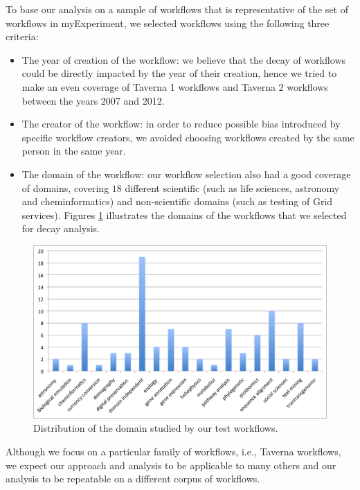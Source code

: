 To base our analysis on a sample of workflows that is representative of the set of workflows in myExperiment, we selected workflows using the following three criteria: 
\begin{itemize}
\item
The year of creation of the workflow: we believe that the decay of workflows could be directly impacted by the year of their creation, hence we tried to make an even coverage of Taverna 1 workflows \cite{DBLP:journals/bioinformatics/OinnAFMSGCGPWL04} and Taverna 2 workflows \cite{DBLP:conf/ssdbm/MissierSOTNDWOG10} between the years 2007 and 2012.
\item
The creator of the workflow:  in order to reduce possible bias introduced by specific workflow creators, we avoided choosing workflows created by the same person in the same year.
\item
The domain of the workflow: our workflow selection also had a good coverage of domains, covering $18$ different scientific (such as life sciences, astronomy and cheminformatics) and non-scientific domains (such as testing of Grid services).  Figures \ref{fig:domain_distribution} illustrates the domains of the workflows that we selected for decay analysis.
\end{itemize}
 
 \begin{figure}[h]
  \begin{center}
    \includegraphics[width=13cm]{./Figures/domain-features.png}
        \caption{Distribution of the domain studied by our test workflows.}
        \label{fig:domain_distribution}
  \end{center}
\end{figure}


Although we focus on a particular family of workflows, i.e., Taverna workflows, we expect our approach and analysis to be applicable to many others and our analysis to be repeatable on a different corpus of workflows. 

